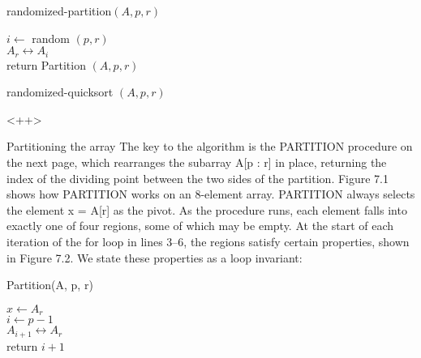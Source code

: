 \begin{algbox}{randomized-partition$(A, p, r)$}
  \begin{algorithm}
      $i \leftarrow $ random $(p, r)$ \\
      $A_{r} \leftrightarrow A_{i} $ \\
      return Partition $(A, p, r)$
    \end{algorithm}
\end{algbox}


    \begin{algbox}{randomized-quicksort $(A, p, r)$}
      \begin{algorithm}
      \end{algorithm}
    \end{algbox}<++>

Partitioning the array
The key to the algorithm is the PARTITION procedure on the next page, which rearranges the subarray A[p : r] in place, returning the index of the dividing point between the two sides of the partition.
Figure 7.1 shows how PARTITION works on an 8-element array. PARTITION always selects the element x = A[r] as the pivot. As the procedure runs, each element falls into exactly one of four regions, some of which may be empty. At the start of each iteration of the for loop in lines 3–6, the regions satisfy certain properties, shown in Figure 7.2. We state these properties as a loop invariant:


\begin{algbox}{Partition(A, p, r)}
  \begin{algorithm}
    $ x \leftarrow A_{r} $ \\
    $ i \leftarrow p - 1 $ \\
   $ A_{i+1} \leftrightarrow A_{r} $\\
   return $ i+1$
  \end{algorithm}
\end{algbox}

